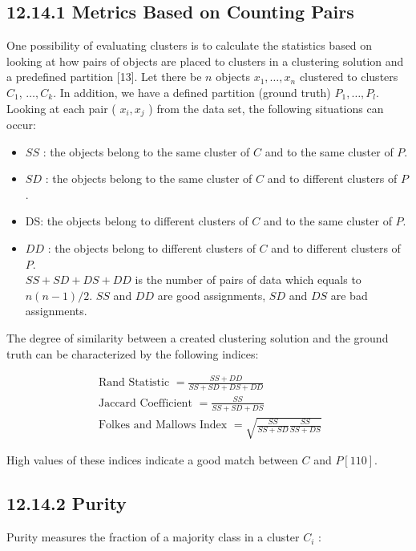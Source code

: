 \documentclass[10pt]{book}
\begin{document}
\subsection*{12.14.1 Metrics Based on Counting Pairs}
One possibility of evaluating clusters is to calculate the statistics based on looking at how pairs of objects are placed to clusters in a clustering solution and a predefined partition [13]. Let there be $n$ objects $x_{1}, \ldots, x_{n}$ clustered to clusters $C_{1}$, $\ldots, C_{k}$. In addition, we have a defined partition (ground truth) $P_{1}, \ldots, P_{l}$. Looking at each pair ( $x_{i}, x_{j}$ ) from the data set, the following situations can occur:

\begin{itemize}
  \item $S S$ : the objects belong to the same cluster of $C$ and to the same cluster of $P$.
  \item $S D$ : the objects belong to the same cluster of $C$ and to different clusters of $P$.
  \item DS: the objects belong to different clusters of $C$ and to the same cluster of $P$.
  \item $D D$ : the objects belong to different clusters of $C$ and to different clusters of $P$.\\
$S S+S D+D S+D D$ is the number of pairs of data which equals to $n(n-1) / 2$. $S S$ and $D D$ are good assignments, $S D$ and $D S$ are bad assignments.
\end{itemize}

The degree of similarity between a created clustering solution and the ground truth can be characterized by the following indices:


\begin{gather*}
\text { Rand Statistic }=\frac{S S+D D}{S S+S D+D S+D D}  \tag{12.37}\\
\text { Jaccard Coefficient }=\frac{S S}{S S+S D+D S}  \tag{12.38}\\
\text { Folkes and Mallows Index }=\sqrt{\frac{S S}{S S+S D} \frac{S S}{S S+D S}} \tag{12.39}
\end{gather*}


High values of these indices indicate a good match between $C$ and $P[110]$.

\subsection*{12.14.2 Purity}
Purity measures the fraction of a majority class in a cluster $C_{i}$ :
\end{document}
